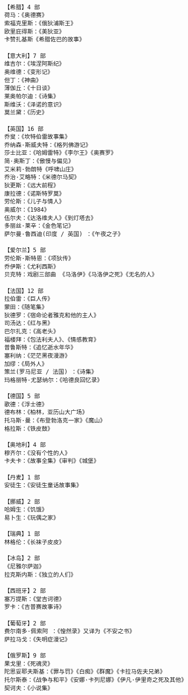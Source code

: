 \documentclass[UTF8]{../RepresentationUniverse}
\begin{document}
\begin{lstlisting}

    【希腊】4 部
    荷马：《奥德赛》
    索福克里斯：《俄狄浦斯王》
    欧里庇得斯：《美狄亚》
    卡赞扎基斯《希腊佐巴的故事》
    
    【意大利】7 部
    维吉尔：《埃涅阿斯纪》
    奥维德：《变形记》
    但丁：《神曲》
    薄伽丘：《十日谈》
    莱奥帕尔迪：《诗集》
    斯维沃：《泽诺的意识》
    莫兰黛：《历史》
    
    【英国】16 部 
    乔叟：《坎特伯雷故事集》
    乔纳森·斯威夫特：《格列佛游记》
    莎士比亚：《哈姆雷特》《李尔王》《奥赛罗》
    简·奥斯丁：《傲慢与偏见》
    艾米莉·勃朗特《呼啸山庄》
    乔治·艾略特：《米德尔马契》
    狄更斯：《远大前程》
    康拉德：《诺斯特罗莫》
    劳伦斯：《儿子与情人》
    奥威尔：《1984》
    伍尔夫：《达洛维夫人》《到灯塔去》
    多丽丝·莱辛：《金色笔记》
    萨尔曼·鲁西迪(印度 / 英国) ：《午夜之子》
    
    【爱尔兰】5 部 
    劳伦斯·斯特恩：《项狄传》
    乔伊斯：《尤利西斯》
    贝克特：戏剧三部曲 《马洛伊》《马洛伊之死》《无名的人》
    
    【法国】12 部 
    拉伯雷：《巨人传》
    蒙田：《随笔集》
    狄德罗：《宿命论者雅克和他的主人》
    司汤达：《红与黑》
    巴尔扎克：《高老头》
    福楼拜：《包法利夫人》、《情感教育》
    普鲁斯特：《追忆逝水年华》
    塞利纳：《茫茫黑夜漫游》
    加缪：《局外人》
    策兰(罗马尼亚 / 法国) ：《诗集》
    玛格丽特·尤瑟纳尔：《哈德良回忆录》
    
    【德国】5 部
    歌德：《浮士德》
    德布林：《柏林，亚历山大广场》
    托马斯·曼：《布登勃洛克一家》《魔山》
    格拉斯：《铁皮鼓》
    
    【奥地利】4 部 
    穆齐尔：《没有个性的人》
    卡夫卡：《故事全集》《审判》《城堡》
    
    【丹麦】1 部 
    安徒生：《安徒生童话故事集》
    
    【挪威】2 部 
    哈姆生：《饥饿》
    易卜生：《玩偶之家》
    
    【瑞典】1 部
    林格伦：《长袜子皮皮》
    
    【冰岛】2 部
    《尼雅尔萨迦》
    拉克斯内斯：《独立的人们》
    
    【西班牙】2 部 
    塞万提斯：《堂吉诃德》
    罗卡：《吉普赛故事诗》
    
    【葡萄牙】2 部
    费尔南多·佩索阿 ：《惶然录》又译为《不安之书》
    萨拉马戈：《失明症漫记》
    
    【俄罗斯】9 部 
    果戈里：《死魂灵》
    陀思妥耶夫斯基：《罪与罚》《白痴》《群魔》《卡拉马佐夫兄弟》
    托尔斯泰：《战争与和平》《安娜·卡列尼娜》《伊凡·伊里奇之死及其他》
    契诃夫：《小说集》
    

\end{lstlisting}
\end{document}
